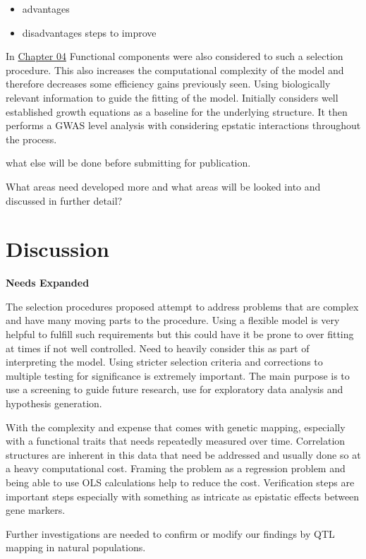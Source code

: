 \documentclass[11pt,]{book}
\providecommand{\tightlist}{%
  \setlength{\itemsep}{0pt}\setlength{\parskip}{0pt}}
\theoremstyle{definition}
\theoremstyle{definition}
\theoremstyle{remark}
\begin{document}
\begin{itemize}
\tightlist
\item
  advantages
\item
  disadvantages steps to improve
\end{itemize}

In \protect\hyperlink{iformfunc}{Chapter 04} Functional components were
also considered to such a selection procedure. This also increases the
computational complexity of the model and therefore decreases some
efficiency gains previously seen. Using biologically relevant
information to guide the fitting of the model. Initially considers well
established growth equations as a baseline for the underlying structure.
It then performs a GWAS level analysis with considering epstatic
interactions throughout the process.

what else will be done before submitting for publication.

What areas need developed more and what areas will be looked into and
discussed in further detail?

\section{Discussion}\label{discussion-3}

\textbf{Needs Expanded}

The selection procedures proposed attempt to address problems that are
complex and have many moving parts to the procedure. Using a flexible
model is very helpful to fulfill such requirements but this could have
it be prone to over fitting at times if not well controlled. Need to
heavily consider this as part of interpreting the model. Using stricter
selection criteria and corrections to multiple testing for significance
is extremely important. The main purpose is to use a screening to guide
future research, use for exploratory data analysis and hypothesis
generation.

With the complexity and expense that comes with genetic mapping,
especially with a functional traits that needs repeatedly measured over
time. Correlation structures are inherent in this data that need be
addressed and usually done so at a heavy computational cost. Framing the
problem as a regression problem and being able to use OLS calculations
help to reduce the cost. Verification steps are important steps
especially with something as intricate as epistatic effects between gene
markers.

Further investigations are needed to confirm or modify our findings by
QTL mapping in natural populations.
\end{document}
